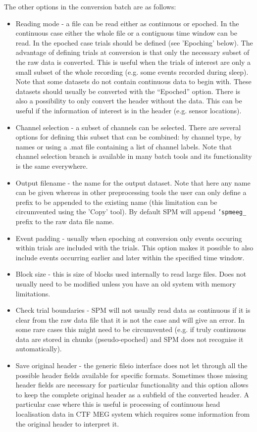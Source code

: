 The other options in the conversion batch are as follows:
\begin{itemize}
\item Reading mode - a file can be read either as continuous or epoched. In the continuous case either the whole file or a contiguous time window can be read. In the epoched case trials should be defined (see 'Epoching' below).  The advantage of defining trials at conversion is that only the necessary subset of the raw data is converted. This is useful when the trials of interest are only a small subset of the whole recording (e.g. some events recorded during sleep). Note that some datasets do not contain continuous data to begin with. These datasets should usually be converted with the ``Epoched'' option. There is also a possibility to only convert the header without the data. This can be useful if the information of interest is in the header (e.g. sensor locations).
\item Channel selection - a subset of channels can be selected. There are several options for defining this subset that can be combined:  by channel type, by names or using a .mat file containing a list of channel labels. Note that channel selection branch is available in many batch tools and its functionality is the same everywhere. 
\item Output filename - the name for the output dataset. Note that here any name can be given whereas in other preprocessing tools the user can only define a prefix to be appended to the existing name (this limitation can be circumvented using the 'Copy' tool). By default SPM will append \texttt{'spmeeg\_} prefix to the raw data file name.
\item Event padding - usually when epoching at conversion only events occuring within trials are included with the trials. This option makes it possible to also include events occurring earlier and later within the specified time window.
\item Block size - this is size of blocks used internally to read large files. Does not usually need to be modified unless you have an old system with memory limitations. 
\item Check trial boundaries - SPM will not usually read data as continuous if it is clear from the raw data file that it is not the case and will give an error. In some rare cases this might need to be circumvented (e.g. if truly continuous data are stored in chunks (pseudo-epoched) and SPM does not recognise it automatically). 
\item Save original header - the generic fileio interface does not let through all the possible header fields available for specific formats. Sometimes those missing header fields are necessary for particular functionality and this option allows to keep the complete original header as a subfield of the converted header. A particular case where this is useful is processing  of continuous head localisation data in CTF MEG system which requires some information from the original header to interpret it.

\end{itemize}
